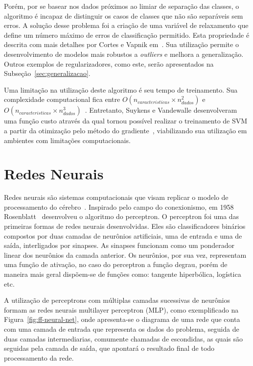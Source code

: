 Porém, por se basear nos dados próximos ao limiar de separação das classes, o algoritmo é incapaz de distinguir os casos
de classes que não são separáveis sem erros.
A solução desse problema foi a criação de uma variável de relaxamento que define um número máximo de erros de
classificação permitido.
Esta propriedade é descrita com mais detalhes por Cortes e Vapnik em~\cite{cortes95}.
Sua utilização permite o desenvolvimento de modelos mais robustos a \textit{outliers} e melhora a generalização.
Outros exemplos de regularizadores, como este, serão apresentados na Subseção~\ref{sec:generalizacao}.

Uma limitação na utilização deste algoritmo é seu tempo de treinamento.
Sua complexidade computacional fica entre $O(n_{caracteristicas} \times n_{dados}^2)$ e
$O(n_{caracteristicas} \times n_{dados}^3)$~\cite{list09}.
Entretanto, Suykens e Vandewalle desenvolveram uma função custo através da qual tornou possível realizar o treinamento
de SVM a partir da otimização pelo método do gradiente~\cite{suykens99}, viabilizando sua utilização em ambientes com
limitações computacionais.


\section{Redes Neurais} \label{sec:nn}

Redes neurais são sistemas computacionais que visam replicar o modelo de processamento do cérebro~\cite{wiener61}.
Inspirado pelo campo do conexionismo, em 1958 Rosenblatt~\cite{rosenblatt58} desenvolveu o algoritmo do perceptron.
O perceptron foi uma das primeiras formas de redes neurais desenvolvidas.
Eles são classificadores binários compostos por duas camadas de neurônios artificiais, uma de entrada e uma de saída,
interligados por sinapses.
As sinapses funcionam como um ponderador linear dos neurônios da camada anterior.
Os neurônios, por sua vez, representam uma função de ativação, no caso do perceptron a função degrau, porém de maneira
mais geral dispõem-se de funções como: tangente hiperbólica, logística etc.

A utilização de perceptrons com múltiplas camadas sucessivas de neurônios formam as redes neurais multilayer perceptron
(MLP), como exemplificado na Figura~\ref{fig:ff-neural-net}, onde apresenta-se o diagrama de uma rede que conta com uma
camada de entrada que representa os dados do problema, seguida de duas camadas intermediarias, comumente chamadas de
escondidas, as quais são seguidas pela camada de saída, que apontará o resultado final de todo processamento da rede.

